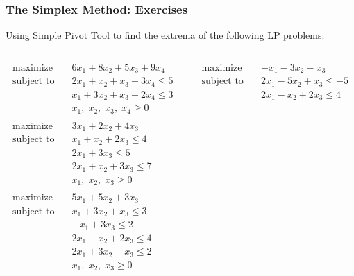 \documentclass[usenames,dvipsnames,8pt]{beamer}%
\begin{document}
\begin{frame}
  \frametitle{The Simplex Method: Exercises}
  Using \href{https://vanderbei.princeton.edu/JAVA/pivot/simple.html}{Simple Pivot Tool} to find the extrema of the following LP problems:
  \begin{columns}
    \begin{column}{0.5\textwidth}
      \begin{align*}
        \text{maximize}\quad    &6 x_1 + 8 x_2 + 5 x_3 + 9 x_4\\
        \text{subject to}\quad  &2 x_1 + x_2 + x_3 + 3 x_4 \leqslant 5\\
                                &x_1 + 3 x_2 + x_3 + 2 x_4\leqslant 3\\
                                &x_1,\;x_2,\;x_3,\;x_4\geqslant 0 \\
                                & \\
        \text{maximize}\quad    &3 x_1 + 2 x_2 + 4 x_3\\
        \text{subject to}\quad  &x_1 + x_2 + 2 x_3\leqslant 4\\
                                &2x_1 + 3 x_3\leqslant 5\\
                                &2 x_1 + x_2 + 3 x_3\leqslant 7\\
                                &x_1,\;x_2,\;x_3\geqslant 0\\
                                & \\
        \text{maximize}\quad    &5 x_1 + 5 x_2 + 3 x_3\\
        \text{subject to}\quad  &x_1 + 3 x_2 + x_3\leqslant 3\\
                                &-x_1 + 3 x_3\leqslant 2\\
                                &2 x_1 - x_2 + 2 x_3\leqslant 4\\
                                &2 x_1 + 3 x_2 - x_3\leqslant 2\\
                                &x_1,\;x_2,\;x_3\geqslant 0
      \end{align*}
    \end{column}
    \begin{column}{0.5\textwidth}
      \begin{align*}
        \text{maximize}\quad    &- x_1 - 3 x_2 - x_3\\
        \text{subject to}\quad  &2 x_1 - 5 x_2 + x_3 \leqslant -5\\
                                &2 x_1 - x_2 + 2 x_3 \leqslant 4\\

\end{align*}
\end{column}
\end{columns}
\end{frame}
\end{document}
